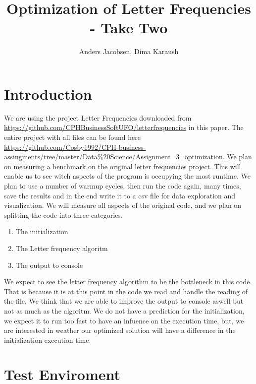 \documentclass{article}
\author{Anders Jacobsen, Dima Karaush}
\title{Optimization of Letter Frequencies - Take Two}
\begin{document}
\maketitle

\newpage

\tableofcontents

\newpage

\section{Introduction}
We are using the project Letter Frequencies downloaded 
from \url{https://github.com/CPHBusinessSoftUFO/letterfrequencies} 
in this paper. The entire project with all files can be found here 
\url{https://github.com/Cosby1992/CPH-business-assingments/tree/master/Data%20Science/Assignment_3_optimization}.
\newline We plan on measuring a benchmark on the original letter frequencies project. 
This will enable us to see witch aspects of the program is occupying the most runtime.
We plan to use a number of warmup cycles, then run the code again, many times, save the results 
and in the end write it to a csv file for data exploration and visualization. 
We will measure all aspects of the original code, and we plan on splitting the code into 
three categories.
\begin{enumerate}
    \item The initialization
    \item The Letter frequency algoritm
    \item The output to console
\end{enumerate}
We expect to see the letter frequency algorithm to be the bottleneck in this
code. That is because it is at this point in the code we read and handle the reading of the file.
We think that we are able to improve the output to console aswell but not as much as the algoritm. 
We do not have a prediction for the initialization, we expect it to run too fast to have an 
infuence on the execution time, but, we are interested in weather our optimized solution will have
a difference in the initialization execution time.

\section{Test Enviroment}
\end{document}
